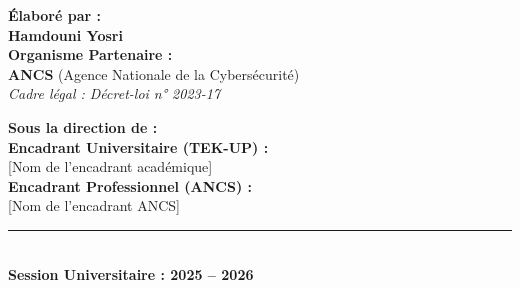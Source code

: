 \begin{titlepage}
\begin{center}
\vspace{0.9cm}

\begin{minipage}[t]{0.48\textwidth}
    \flushleft
    \textbf{Élaboré par :}\\[1.5mm]
    {\large \textbf{Hamdouni Yosri}}\\[4mm]
    \textbf{Organisme Partenaire :}\\[1.5mm]
    {\textbf{ANCS} (Agence Nationale de la Cybersécurité)}\\
    \textit{\footnotesize Cadre légal : Décret-loi n° 2023-17}
\end{minipage}
\hfill
\begin{minipage}[t]{0.48\textwidth}
    \flushleft
    \textbf{Sous la direction de :}\\[1.5mm]
    \textbf{Encadrant Universitaire (TEK-UP) :}\\
    {\small [Nom de l'encadrant académique]}\\[3mm]
    \textbf{Encadrant Professionnel (ANCS) :}\\
    {\small [Nom de l'encadrant ANCS]}
\end{minipage}

\vfill

{\color{tekupPurple}\rule{0.85\textwidth}{0.8pt}}\\[2mm]
{\small \textbf{Session Universitaire : 2025 -- 2026}}

\end{center}
\end{titlepage}
